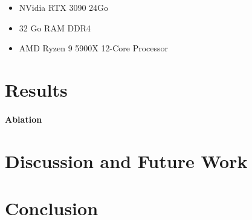 \begin{itemize}
    \item NVidia RTX 3090 24Go
    \item 32 Go RAM DDR4
    \item AMD Ryzen 9 5900X 12-Core Processor
\end{itemize}

\section{Results}

\paragraph{Ablation}

\section{Discussion and Future Work}

\section{Conclusion}


\newpage



